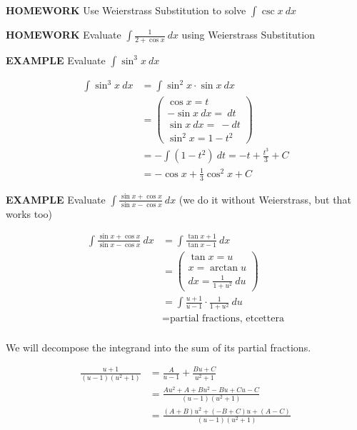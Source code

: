 \documentclass{article}
\begin{document}
\vspace{10pt}

{\bf{}HOMEWORK} Use Weierstrass Substitution to solve $\displaystyle\int\csc x\ dx$

\vspace{10pt}

{\bf{}HOMEWORK} Evaluate $\displaystyle\int\frac{1}{2+\cos x}\ dx$ using Weierstrass Substitution

\vspace{10pt}

{\bf{}EXAMPLE} Evaluate $\displaystyle\int\sin^3x\ dx$

\begin{align*}
\int\sin^3x\ dx&=\int\sin^2x\cdot\sin x\ dx\\
&=\left(\begin{aligned}\cos x=t\\-\sin x\ dx=\ dt\\\sin x\ dx=\ -dt\\\sin^2x=1-t^2\end{aligned}\right)\\
&=-\int(1-t^2)\ dt=-t+\frac{t^3}{3}+C\\
&=-\cos x+\frac{1}{3}\cos^2x+C
\end{align*}

\newpage

{\bf{}EXAMPLE} Evaluate $\displaystyle\int\frac{\sin x+\cos x}{\sin x-\cos x}\ dx$ (we do it without Weierstrass, but that works too)

\begin{align*}
\int\frac{\sin x+\cos x}{\sin x-\cos x}\ dx&=\int\frac{\tan x+1}{\tan x-1}\ dx\\
&=\left(\begin{aligned}\tan x=u\\x=\arctan u\\dx=\frac{1}{1+u^2}\ du\end{aligned}\right)\\
&=\int\frac{u+1}{u-1}\cdot\frac{1}{1+u^2}\ du\\
&=\mbox{partial fractions, etcettera}\\
\end{align*}

\vspace{10pt}

We will decompose the integrand into the sum of its partial fractions.

\begin{align*}
\frac{u+1}{(u-1)(u^2+1)}&=\frac{A}{u-1}+\frac{Bu+C}{u^2+1}\\
&=\frac{Au^2+A+Bu^2-Bu+Cu-C}{(u-1)(u^2+1)}\\
&=\frac{(A+B)u^2+(-B+C)u+(A-C)}{(u-1)(u^2+1)}
\end{align*}
\end{document}
